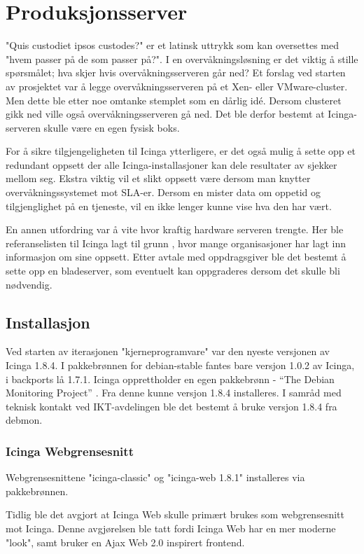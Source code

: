 \section{Produksjonsserver}
"Quis custodiet ipsos custodes?" er et latinsk uttrykk som kan oversettes med "hvem passer på de som passer på?". I en overvåkningsløsning er det viktig å stille spørsmålet; hva skjer hvis overvåkningsserveren går ned? Et forslag ved starten av prosjektet var å legge overvåkningsserveren på et Xen- eller VMware-cluster. Men dette ble etter noe omtanke stemplet som en dårlig idé. Dersom clusteret gikk ned ville også overvåkningsserveren gå ned. Det ble derfor bestemt at Icinga-serveren skulle være en egen fysisk boks. 

For å sikre tilgjengeligheten til Icinga ytterligere, er det også mulig å sette opp et redundant oppsett der alle Icinga-installasjoner kan dele resultater av sjekker mellom seg. Ekstra viktig vil et slikt oppsett være dersom man knytter overvåkningssystemet mot SLA-er. Dersom en mister data om oppetid og tilgjenglighet på en tjeneste, vil en ikke lenger kunne vise hva den har vært.

En annen utfordring var å vite hvor kraftig hardware serveren trengte. Her ble referanselisten til Icinga lagt til grunn \cite{icingainaction}, hvor mange organisasjoner har lagt inn informasjon om sine oppsett. Etter avtale med oppdragsgiver ble det bestemt å sette opp en bladeserver, som eventuelt kan oppgraderes dersom det skulle bli nødvendig. 

\subsection{Installasjon}
Ved starten av iterasjonen "kjerneprogramvare" var den nyeste versjonen av Icinga 1.8.4. I pakkebrønnen for debian-stable fantes bare versjon 1.0.2 av Icinga, i backports lå 1.7.1. Icinga opprettholder en egen pakkebrønn - ``The Debian Monitoring Project'' \cite{debmon}. Fra denne kunne versjon 1.8.4 installeres. I samråd med teknisk kontakt ved IKT-avdelingen ble det bestemt å bruke versjon 1.8.4 fra debmon.

\subsubsection{Icinga Webgrensesnitt}
Webgrensesnittene "icinga-classic" og "icinga-web 1.8.1" installeres via pakkebrønnen. 

Tidlig ble det avgjort at Icinga Web skulle primært brukes som webgrensesnitt mot Icinga. Denne avgjørelsen ble tatt fordi Icinga Web har en mer moderne "look", samt bruker en Ajax Web 2.0 inspirert frontend.

